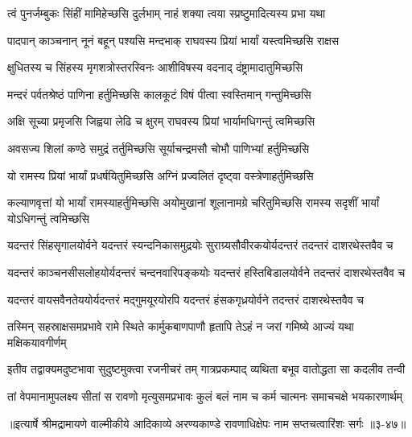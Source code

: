 \twolineshloka
{त्वं पुनर्जम्बुकः सिंहीं मामिहेच्छसि दुर्लभाम्}
{नाहं शक्या त्वया स्प्रष्टुमादित्यस्य प्रभा यथा} %

\twolineshloka
{पादपान् काञ्चनान् नूनं बहून् पश्यसि मन्दभाक्}
{राघवस्य प्रियां भार्यां यस्त्वमिच्छसि राक्षस} %

\twolineshloka
{क्षुधितस्य च सिंहस्य मृगशत्रोस्तरस्विनः}
{आशीविषस्य वदनाद् दंष्ट्रामादातुमिच्छसि} %

\twolineshloka
{मन्दरं पर्वतश्रेष्ठं पाणिना हर्तुमिच्छसि}
{कालकूटं विषं पीत्वा स्वस्तिमान् गन्तुमिच्छसि} %

\twolineshloka
{अक्षि सूच्या प्रमृजसि जिह्वया लेढि च क्षुरम्}
{राघवस्य प्रियां भार्यामधिगन्तुं त्वमिच्छसि} %

\twolineshloka
{अवसज्य शिलां कण्ठे समुद्रं तर्तुमिच्छसि}
{सूर्याचन्द्रमसौ चोभौ पाणिभ्यां हर्तुमिच्छसि} %

\twolineshloka
{यो रामस्य प्रियां भार्यां प्रधर्षयितुमिच्छसि}
{अग्निं प्रज्वलितं दृष्ट्वा वस्त्रेणाहर्तुमिच्छसि} %

\threelineshloka
{कल्याणवृत्तां यो भार्यां रामस्याहर्तुमिच्छसि}
{अयोमुखानां शूलानामग्रे चरितुमिच्छसि}
{रामस्य सदृशीं भार्यां योऽधिगन्तुं त्वमिच्छसि} %

\twolineshloka
{यदन्तरं सिंहसृगालयोर्वने यदन्तरं स्यन्दनिकासमुद्रयोः}
{सुराग्र्यसौवीरकयोर्यदन्तरं तदन्तरं दाशरथेस्तवैव च} %

\twolineshloka
{यदन्तरं काञ्चनसीसलोहयोर्यदन्तरं चन्दनवारिपङ्कयोः}
{यदन्तरं हस्तिबिडालयोर्वने तदन्तरं दाशरथेस्तवैव च} %

\twolineshloka
{यदन्तरं वायसवैनतेययोर्यदन्तरं मद्गुमयूरयोरपि}
{यदन्तरं हंसकगृध्रयोर्वने तदन्तरं दाशरथेस्तवैव च} %

\twolineshloka
{तस्मिन् सहस्राक्षसमप्रभावे रामे स्थिते कार्मुकबाणपाणौ}
{हृतापि तेऽहं न जरां गमिष्ये आज्यं यथा मक्षिकयावगीर्णम्} %

\twolineshloka
{इतीव तद्वाक्यमदुष्टभावा सुदुष्टमुक्त्वा रजनीचरं तम्}
{गात्रप्रकम्पाद् व्यथिता बभूव वातोद्धता सा कदलीव तन्वी} %

\twolineshloka
{तां वेपमानामुपलक्ष्य सीतां स रावणो मृत्युसमप्रभावः}
{कुलं बलं नाम च कर्म चात्मनः समाचचक्षे भयकारणार्थम्} %


॥इत्यार्षे श्रीमद्रामायणे वाल्मीकीये आदिकाव्ये अरण्यकाण्डे रावणाधिक्षेपः नाम सप्तचत्वारिंशः सर्गः ॥३-४७॥

